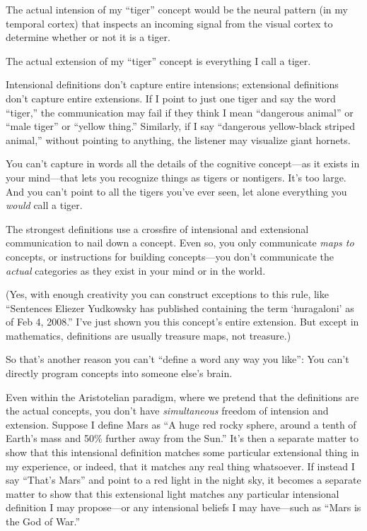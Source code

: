 {{{
 The actual intension of my
``tiger'' concept would be the
neural pattern (in my temporal cortex) that inspects an incoming signal
from the visual cortex to determine whether or not it is a tiger.}

{
 The actual extension of my
``tiger'' concept is everything I
call a tiger.}

{
 Intensional definitions don't capture entire
intensions; extensional definitions don't capture
entire extensions. If I point to just one tiger and say the word
``tiger,'' the communication may
fail if they think I mean ``dangerous
animal'' or ``male
tiger'' or ``yellow
thing.'' Similarly, if I say
``dangerous yellow-black striped
animal,'' without pointing to anything, the listener
may visualize giant hornets.}

{
 You can't capture in words all the details of the
cognitive concept---as it exists in your mind---that lets you recognize
things as tigers or nontigers. It's too large. And you
can't point to all the tigers you've
ever seen, let alone everything you \textit{would} call a tiger.}

{
 The strongest definitions use a crossfire of intensional and
extensional communication to nail down a concept. Even so, you only
communicate \textit{maps to} concepts, or instructions for building
concepts---you don't communicate the \textit{actual}
categories as they exist in your mind or in the world.}

{
 (Yes, with enough creativity you can construct exceptions to this
rule, like ``Sentences Eliezer Yudkowsky has published
containing the term `huragaloni' as of
Feb 4, 2008.'' I've just shown you
this concept's entire extension. But except in
mathematics, definitions are usually treasure maps, not treasure.)}

{
 So that's another reason you can't
``define a word any way you like'':
You can't directly program concepts into someone
else's brain.}

{
 Even within the Aristotelian paradigm, where we pretend that the
definitions are the actual concepts, you don't have
\textit{simultaneous} freedom of intension and extension. Suppose I
define Mars as ``A huge red rocky sphere, around a
tenth of Earth's mass and 50\% further away from the
Sun.'' It's then a separate matter to
show that this intensional definition matches some particular
extensional thing in my experience, or indeed, that it matches any real
thing whatsoever. If instead I say
``That's Mars'' and
point to a red light in the night sky, it becomes a separate matter to
show that this extensional light matches any particular intensional
definition I may propose---or any intensional beliefs I may have---such
as ``Mars is the God of War.''}

}}
